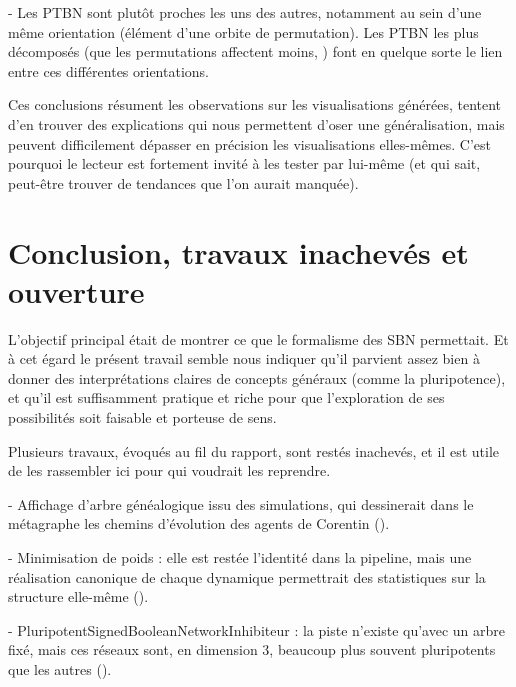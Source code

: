 \documentclass[12pt, a4paper]{article}
\begin{document}
- Les PTBN sont plutôt proches les uns des autres, notamment au sein d'une même orientation (élément d'une orbite de permutation). Les PTBN les plus décomposés (que les permutations affectent moins, ) font en quelque sorte le lien entre ces différentes orientations.

Ces conclusions résument les observations sur les visualisations générées, tentent d'en trouver des explications qui nous permettent d'oser une généralisation, mais peuvent difficilement dépasser en précision les visualisations elles-mêmes. C'est pourquoi le lecteur est fortement invité à les tester par lui-même (et qui sait, peut-être trouver de tendances que l'on aurait manquée).

\section{Conclusion, travaux inachevés et ouverture}

L'objectif principal était de montrer ce que le formalisme des SBN permettait. Et à cet égard le présent travail semble nous indiquer qu'il parvient assez bien à donner des interprétations claires de concepts généraux (comme la pluripotence), et qu'il est suffisamment pratique et riche pour que l'exploration de ses possibilités soit faisable et porteuse de sens.

\vspace{5pt}
Plusieurs travaux, évoqués au fil du rapport, sont restés inachevés, et il est utile de les rassembler ici pour qui voudrait les reprendre.

- Affichage d'arbre généalogique issu des simulations, qui dessinerait dans le métagraphe les chemins d'évolution des agents de Corentin ().

- Minimisation de poids : elle est restée l'identité dans la pipeline, mais une réalisation canonique de chaque dynamique permettrait des statistiques sur la structure elle-même ().

- PluripotentSignedBooleanNetworkInhibiteur : la piste n'existe qu'avec un arbre fixé, mais ces réseaux sont, en dimension 3, beaucoup plus souvent pluripotents que les autres ().
\end{document}
